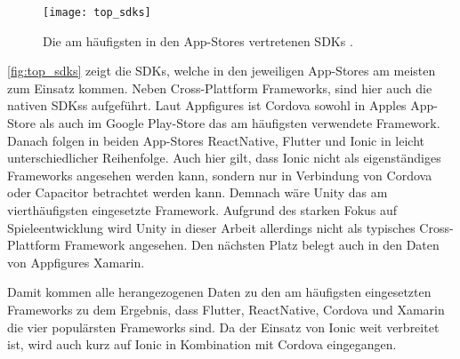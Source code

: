 \begin{figure}[ht]
  \centering
  \texttt{[image: top\_sdks]}
  \caption{Die am häufigsten in den App-Stores vertretenen \acp{SDK} \cite{Appfigures_TopSDKs}.}
  \label{fig:top_sdks}  
\end{figure}

\autoref{fig:top_sdks} zeigt die \acp{SDK}, welche in den jeweiligen App-Stores am meisten zum Einsatz kommen.
Neben Cross-Plattform Frameworks, sind hier auch die nativen \acp{SDKs} aufgeführt.
Laut Appfigures \cite{Appfigures_TopSDKs} ist Cordova sowohl in Apples App-Store als auch im Google Play-Store das am häufigsten verwendete Framework.
Danach folgen in beiden App-Stores ReactNative, Flutter und Ionic in leicht unterschiedlicher Reihenfolge.
Auch hier gilt, dass Ionic nicht als eigenständiges Frameworks angesehen werden kann, sondern nur in Verbindung von Cordova oder Capacitor betrachtet werden kann.
Demnach wäre Unity das am vierthäufigsten eingesetzte Framework.
Aufgrund des starken Fokus auf Spieleentwicklung \cite{Unity} wird Unity in dieser Arbeit allerdings nicht als typisches Cross-Plattform Framework angesehen.
Den nächsten Platz belegt auch in den Daten von Appfigures Xamarin.

Damit kommen alle herangezogenen Daten zu den am häufigsten eingesetzten Frameworks zu dem Ergebnis, dass Flutter, ReactNative, Cordova und Xamarin die vier populärsten Frameworks sind.
Da der Einsatz von Ionic weit verbreitet ist, wird auch kurz auf Ionic in Kombination mit Cordova eingegangen.





